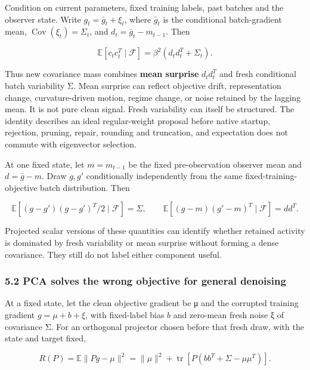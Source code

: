 \documentclass[
  british,
  10pt,
  a4paper,
]{article}
\begin{document}
Condition on current parameters,\allowbreak{} fixed training labels,
past batches and the observer state. Write \(g_t=\bar g_t+\xi_t\), where
\(\bar g_t\) is the conditional batch-\allowbreak{}gradient mean,
\(\operatorname{Cov}(\xi_t)=\Sigma_t\), and \(d_t=\bar g_t-m_{t-1}\).
Then

\[
\mathbb E[c_tc_t^T\mid\mathcal F]
=\beta^2(d_td_t^T+\Sigma_t).
\]

Thus new covariance mass combines \textbf{mean surprise} \(d_td_t^T\)
and fresh conditional batch variability Σ. Mean surprise can reflect
objective drift, representation change, curvature-\allowbreak{}driven
motion, regime change, or noise retained by the lagging mean. It is not
pure clean signal. Fresh variability can itself be
structured.\allowbreak{} The identity describes an ideal
regular-\allowbreak{}weight proposal before native startup, rejection,
pruning, repair, rounding and truncation,\allowbreak{} and expectation
does not commute with eigenvector selection.

At one fixed state, let \(m=m_{t-1}\) be the fixed
pre-\allowbreak{}observation observer mean and \(d=\bar g-m\). Draw
\(g,g'\) conditionally independently from the same
fixed-\allowbreak{}training-\allowbreak{}objective batch
distribution\allowbreak{}.\allowbreak{} Then

\[
\mathbb E[(g-g')(g-g')^T/2\mid\mathcal F]=\Sigma,
\qquad
\mathbb E[(g-m)(g'-m)^T\mid\mathcal F]=dd^T.
\]

Projected scalar versions of these quantities can identify whether
retained activity is dominated by fresh variability or mean surprise
without forming a dense covariance.\allowbreak{} They still do not label
either component useful.

\subsubsection{5.2 PCA solves the wrong objective for general
denoising}\label{synthesis--pca-solves-the-wrong-objective-for-general-denoising}

At a fixed state, let the clean objective gradient be μ and the
corrupted training gradient \(g=\mu+b+\xi\), with
fixed-\allowbreak{}label bias \(b\) and zero-mean fresh noise ξ of
covariance Σ. For an orthogonal projector chosen before that fresh draw,
with the state and target fixed,

\[
R(P)=\mathbb E\|Pg-\mu\|^2
=\|\mu\|^2+\operatorname{tr}\!\left[P(bb^T+\Sigma-\mu\mu^T)\right].
\]
\end{document}
